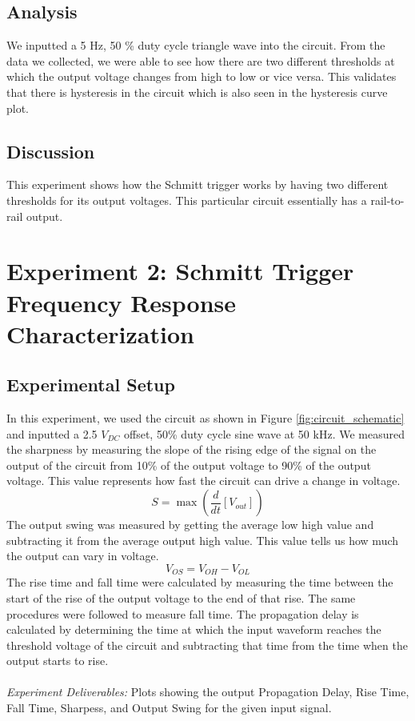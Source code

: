\documentclass[9pt,a4paper,twoside]{tau-class/tau}
\begin{document}
	\subsection{Analysis}
	We inputted a 5 Hz, 50 \% duty cycle triangle wave into the circuit. From the data we collected, we were able to see how there are two different thresholds at which the output voltage changes from high to low or vice versa. This validates that there is hysteresis in the circuit which is also seen in the hysteresis curve plot.
	\subsection{Discussion}
	This experiment shows how the Schmitt trigger works by having two different thresholds for its output voltages. This particular circuit essentially has a rail-to-rail output.
\section{Experiment 2: Schmitt Trigger Frequency Response Characterization}
	\subsection{Experimental Setup}
	In this experiment, we used the circuit as shown in Figure \ref{fig:circuit_schematic} and inputted a 2.5 $V_{DC}$ offset, 50\% duty cycle sine wave at 50 kHz. We measured the sharpness by measuring the slope of the rising edge of the signal on the output of the circuit from 10\% of the output voltage to 90\% of the output voltage. This value represents how fast the circuit can drive a change in voltage.
	\[S=\max\left(\frac{d}{dt}[V_{out}]\right)\]
	The output swing was measured by getting the average low high value and subtracting it from the average output high value. This value tells us how much the output can vary in voltage.
	\[V_{OS}=V_{OH}-V_{OL}\]
	The rise time and fall time were calculated by measuring the time between the start of the rise of the output voltage to the end of that rise. The same procedures were followed to measure fall time. The propagation delay is calculated by determining the time at which the input waveform reaches the threshold voltage of the circuit and subtracting that time from the time when the output starts to rise.\\
	\\
	\textit{Experiment Deliverables:} Plots showing the output Propagation Delay, Rise Time, Fall Time, Sharpess, and Output Swing for the given input signal.
\end{document}
